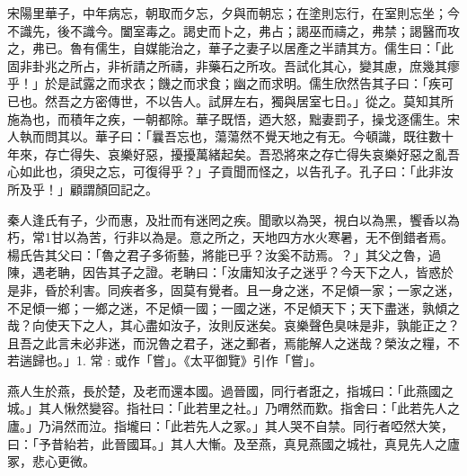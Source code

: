 \begin{pinyinscope}
宋陽里華子，中年病忘，朝取而夕忘，夕與而朝忘；在塗則忘行，在室則忘坐；今不識先，後不識今。闔室毒之。謁史而卜之，弗占；謁巫而禱之，弗禁；謁醫而攻之，弗已。魯有儒生，自媒能治之，華子之妻子以居產之半請其方。儒生曰：「此固非卦兆之所占，非祈請之所禱，非藥石之所攻。吾試化其心，變其慮，庶幾其瘳乎！」於是試露之而求衣；饑之而求食；幽之而求明。儒生欣然告其子曰：「疾可已也。然吾之方密傳世，不以告人。試屏左右，獨與居室七日。」從之。莫知其所施為也，而積年之疾，一朝都除。華子既悟，迺大怒，黜妻罰子，操戈逐儒生。宋人執而問其以。華子曰：「曩吾忘也，蕩蕩然不覺天地之有无。今頓識，既往數十年來，存亡得失、哀樂好惡，擾擾萬緒起矣。吾恐將來之存亡得失哀樂好惡之亂吾心如此也，須臾之忘，可復得乎？」子貢聞而怪之，以告孔子。孔子曰：「此非汝所及乎！」顧謂顏回記之。

秦人逢氏有子，少而惠，及壯而有迷罔之疾。聞歌以為哭，視白以為黑，饗香以為朽，常1甘以為苦，行非以為是。意之所之，天地四方水火寒暑，无不倒錯者焉。楊氏告其父曰：「魯之君子多術藝，將能已乎？汝奚不訪焉。？」其父之魯，過陳，遇老聃，因告其子之證。老聃曰：「汝庸知汝子之迷乎？今天下之人，皆惑於是非，昏於利害。同疾者多，固莫有覺者。且一身之迷，不足傾一家；一家之迷，不足傾一鄉；一鄉之迷，不足傾一國；一國之迷，不足傾天下；天下盡迷，孰傾之哉？向使天下之人，其心盡如汝子，汝則反迷矣。哀樂聲色臭味是非，孰能正之？且吾之此言未必非迷，而況魯之君子，迷之郵者，焉能解人之迷哉？榮汝之糧，不若遄歸也。」1. 常 : 或作「嘗」。《太平御覽》引作「嘗」。

燕人生於燕，長於楚，及老而還本國。過晉國，同行者誑之，指城曰：「此燕國之城。」其人愀然變容。指社曰：「此若里之社。」乃喟然而歎。指舍曰：「此若先人之廬。」乃涓然而泣。指壠曰：「此若先人之冢。」其人哭不自禁。同行者啞然大笑，曰：「予昔紿若，此晉國耳。」其人大慚。及至燕，真見燕國之城社，真見先人之廬冢，悲心更微。


\end{pinyinscope}